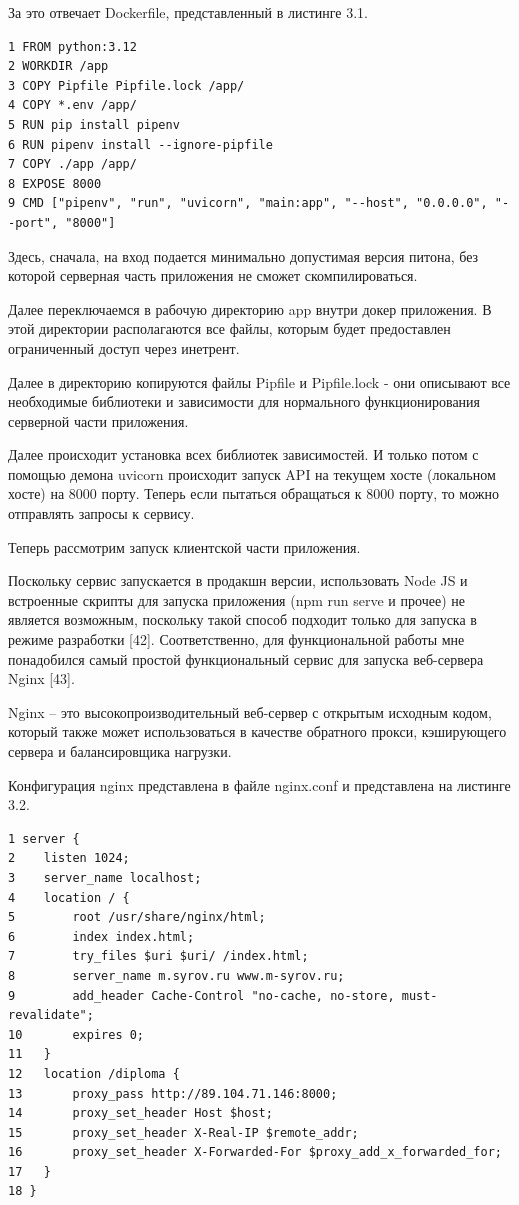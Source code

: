 \documentclass[a4paper,14pt,oneside]{extreport}
\begin{document}
За это отвечает Dockerfile, представленный в листинге 3.1.

\begin{lstlisting}[caption=Dockerfile серверной части]
1 FROM python:3.12
2 WORKDIR /app
3 COPY Pipfile Pipfile.lock /app/
4 COPY *.env /app/
5 RUN pip install pipenv
6 RUN pipenv install --ignore-pipfile
7 COPY ./app /app/
8 EXPOSE 8000
9 CMD ["pipenv", "run", "uvicorn", "main:app", "--host", "0.0.0.0", "--port", "8000"]
\end{lstlisting}

Здесь, сначала, на вход подается минимально допустимая версия питона, без которой серверная часть приложения не сможет скомпилироваться.

Далее переключаемся в рабочую директорию app внутри докер приложения. В этой директории располагаются все файлы, которым будет предоставлен ограниченный доступ через инетрент.

Далее в директорию копируются файлы Pipfile и Pipfile.lock - они описывают все необходимые библиотеки и зависимости для нормального функционирования серверной части приложения.

Далее происходит установка всех библиотек зависимостей.
И только потом с помощью демона uvicorn происходит запуск API на текущем хосте (локальном хосте) на 8000 порту. 
Теперь если пытаться обращаться к 8000 порту, то можно отправлять запросы к сервису.

Теперь рассмотрим запуск клиентской части приложения.

Поскольку сервис запускается в продакшн версии, использовать Node JS и встроенные скрипты для запуска приложения (npm run serve и прочее) не является возможным, поскольку такой способ подходит только для запуска в режиме разработки [42].
Соответственно, для функциональной работы мне понадобился самый простой функциональный сервис для запуска веб-сервера Nginx [43].

Nginx – это высокопроизводительный веб-сервер с открытым исходным кодом, который также может использоваться в качестве обратного прокси, кэширующего сервера и балансировщика нагрузки.

Конфигурация nginx представлена в файле nginx.conf и представлена на листинге 3.2.
\begin{lstlisting}[caption=Конфигурация Nginx]
1 server {
2    listen 1024;
3    server_name localhost;
4    location / {
5        root /usr/share/nginx/html;
6        index index.html;
7        try_files $uri $uri/ /index.html;
8        server_name m.syrov.ru www.m-syrov.ru;
9        add_header Cache-Control "no-cache, no-store, must-revalidate";
10       expires 0;
11   }
12   location /diploma {
13       proxy_pass http://89.104.71.146:8000;
14       proxy_set_header Host $host;
15       proxy_set_header X-Real-IP $remote_addr;
16       proxy_set_header X-Forwarded-For $proxy_add_x_forwarded_for;
17   }
18 }
\end{lstlisting}
\end{document}
